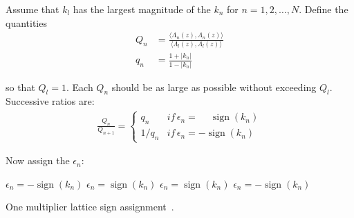 \documentclass[a4paper,twoside,10pt,english]{article}
\DeclareMathOperator{\sign}{sign}
\begin{document}
\begin{algorithm}
Assume that $k_{l}$ has the largest magnitude of the $k_{n}$ for
$n=1,2,\ldots,N$. Define the quantities
\begin{align*}
  Q_{n}&=\frac{\langle\Lambda_{n}\left(z\right),\Lambda_{n}\left(z\right)\rangle}
             {\langle\Lambda_{l}\left(z\right),\Lambda_{l}\left(z\right)\rangle}\\
  q_{n}&=\frac{1+\left|k_{n}\right|}{1-\left|k_{n}\right|}
\end{align*}

so that $Q_{l}=1$. Each $Q_{n}$ should be as large as possible without
exceeding $Q_{l}$. Successive ratios are:
\begin{align}
\frac{Q_{n}}{Q_{n+1}} = \begin{cases}
q_{n} & if\,\epsilon_{n}=\phantom{-}\sign\left(k_{n}\right)\\
1/q_{n} & if\,\epsilon_{n}=-\sign\left(k_{n}\right)
\end{cases}\label{eq:OneMultRecursiveKCalc}
\end{align}

Now assign the $\epsilon_{n}$:
\begin{algorithmic}
    \State $\epsilon_{n}=-\sign\left(k_{n}\right)$
  \Else
    \State $\epsilon_{n}=\sign\left(k_{n}\right)$
  \EndIf
\EndFor
{}
    \State $\epsilon_{n}=\sign\left(k_{n}\right)$
  \Else
    \State $\epsilon_{n}=-\sign\left(k_{n}\right)$
  \EndIf
\EndFor
\end{algorithmic}
\caption{One multiplier lattice sign
  assignment~\cite[p. 496]{GrayMarkel_DigitalLatticeAndLadderFilterSynthesis}.} 
\label{alg:One-multiplier-sign-assignment}
\end{algorithm}
\end{document}
